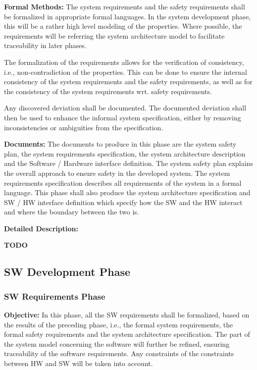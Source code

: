 {\bf Formal Methods:} The system requirements and the safety requirements shall
be formalized in appropriate formal languages. In the system development phase,
this will be a rather high level modeling of the properties. Where possible, the
requirements will be referring the system architecture model to facilitate
traceability in later phases.

The formalization of the requirements allows for the verification of
consistency, i.e., non-contradiction of the properties. This can be done to
ensure the internal consistency of the system requirements and the safety
requirements, as well as for the consistency of the system requirements
wrt. safety requirements.

Any discovered deviation shall be documented. The documented deviation shall
then be used to enhance the informal system specification, either by removing
inconsistencies or ambiguities from the specification.

{\bf Documents:} The documents to produce in this phase are the system safety
plan, the system requirements specification, the system architecture description
and the Software / Hardware interface definition. The system safety plan
explains the overall approach to ensure safety in the developed system. The
system requirements specification describes all requirements of the system in a
formal language. This phase shall also produce the system architecture
specification and SW / HW interface definition which specify how the SW and the
HW interact and where the boundary between the two is.

{\bf Detailed Description:}

{\Huge \bf TODO}

\subsection{SW Development Phase}
\label{sec:sw-development-phase}

\subsubsection{SW Requirements Phase}
\label{sec:sw-requ-phase}

{\bf Objective:} In this phase, all the SW requirements shall be formalized,
based on the results of the preceding phase, i.e., the formal system
requirements, the formal safety requirements and the system architecture
specification. The part of the system model concerning the software will further
be refined, ensuring traceability of the software requirements. Any constraints
of the constraints between HW and SW will be taken into account.

